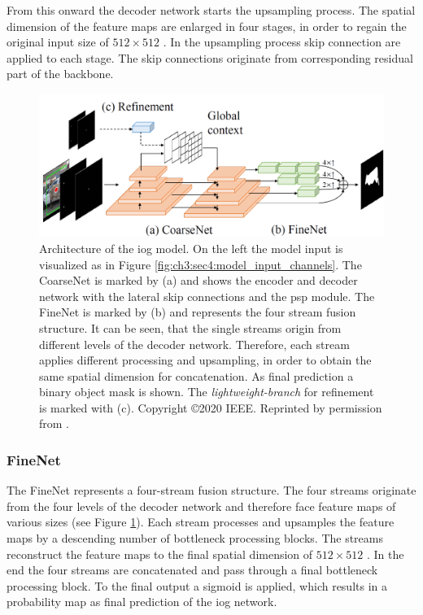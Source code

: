 From this onward the decoder network starts the upsampling process. 
The spatial dimension of the feature maps are enlarged in four stages, in order to regain the original input size of  $512 \times 512$ . 
In the upsampling process skip connection are applied to each stage.
The skip connections originate from corresponding residual part of the backbone.
\begin{figure}
	\includegraphics[width=\linewidth]{figures/chap34_iog_arch.png}
	\caption[IOG Architecture]{		
		Architecture of the \gls{iog} model.
		On the left the model input is visualized as in Figure \ref{fig:ch3:sec4:model_input_channels}.
		The CoarseNet is marked by (a) and shows the encoder and decoder network with the lateral skip connections and the \gls{psp} module.
		The FineNet is marked by (b) and represents the four stream fusion structure.
		It can be seen, that the single streams origin from different levels of the decoder network.
		Therefore, each stream applies different processing and upsampling, in order to obtain the same spatial dimension for concatenation.		
		As final prediction a binary object mask is shown.
		The \textit{lightweight-branch} for refinement is marked with (c).
		Copyright \copyright 2020 IEEE. Reprinted by permission from \cite{Zha20-IOG}.
	}
	\label{fig:ch3:sec4:arch}
\end{figure}

\subsubsection{FineNet}
The FineNet represents a four-stream fusion structure.
The four streams originate from the four levels of the decoder network and therefore face feature maps of various sizes (see Figure \ref{fig:ch3:sec4:arch}).
Each stream processes and upsamples the feature maps by a descending number of bottleneck processing blocks.
The streams reconstruct the feature maps to the final spatial dimension of $512 \times 512$ .
In the end the four streams are concatenated and pass through a final bottleneck processing block.
To the final output a sigmoid is applied, which results in a probability map as final prediction of the \gls{iog} network.

